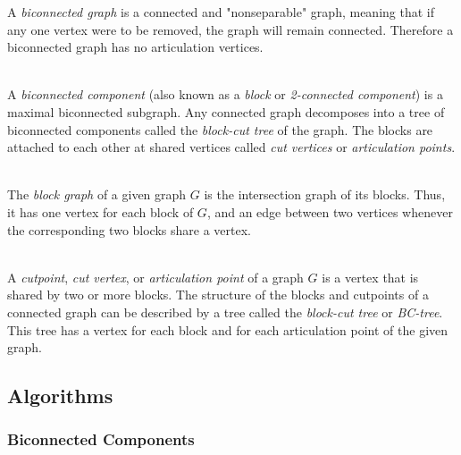 \documentclass[a4paper, 12pt]{article}
\begin{document}
A \textit{biconnected graph} is a connected and "nonseparable" graph, meaning that if any one vertex were to be removed, the graph will remain connected. Therefore a biconnected graph has no articulation vertices.

~\\
A \textit{biconnected component} (also known as a \textit{block} or \textit{2-connected component}) is a maximal biconnected subgraph. Any connected graph decomposes into a tree of biconnected components called the \textit{block-cut tree} of the graph. The blocks are attached to each other at shared vertices called \textit{cut vertices} or \textit{articulation points}.

~\\
The \textit{block graph} of a given graph $G$ is the intersection graph of its blocks. Thus, it has one vertex for each block of $G$, and an edge between two vertices whenever the corresponding two blocks share a vertex.

~\\
A \textit{cutpoint}, \textit{cut vertex}, or \textit{articulation point} of a graph $G$ is a vertex that is shared by two or more blocks. The structure of the blocks and cutpoints of a connected graph can be described by a tree called the \textit{block-cut tree} or \textit{BC-tree}. This tree has a vertex for each block and for each articulation point of the given graph.

  \subsection{Algorithms}

    \subsubsection{Biconnected Components}
\end{document}
